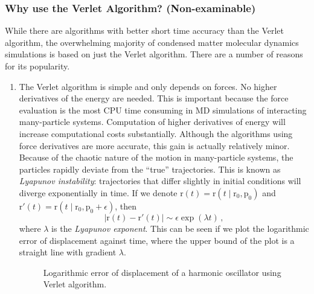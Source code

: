 \documentclass{article}
\theoremstyle{plain}\theoremheaderfont{\normalfont\itshape}\theorembodyfont{\rmfamily}\theoremseparator{.}\newtheorem*{rem}{Remark}\newtheorem*{ex}{Example}\newtheorem*{proof}{Proof}\newtheorem*{altp}{Alternative proof}
\theoremstyle{plain}\theoremheaderfont{\normalfont\bfseries}\theorembodyfont{\rmfamily}\theoremseparator{.}\newtheorem{thm}{Theorem}[section]\newtheorem{lem}[thm]{Lemma}\newtheorem{prop}[thm]{Proposition}\newtheorem*{cor}{Corollary}\newtheorem{defn}[thm]{Definition}\newtheorem{clm}[thm]{Claim}\newtheorem{clminproof}{Claim}\newtheorem{alg}[thm]{Algorithm}\newtheorem{hyp}[thm]{Hypothesis}\newtheorem{law}[thm]{Law}
\theoremstyle{break}\theoremheaderfont{\normalfont\itshape}\theorembodyfont{\rmfamily}\theoremseparator{.\medskip}\newtheorem*{proofskip}{Proof}\newtheorem*{exs}{Examples}\newtheorem*{rems}{Remarks}
\theoremstyle{break}\theoremheaderfont{\normalfont\bfseries}\theorembodyfont{\rmfamily}\theoremseparator{.\medskip}\newtheorem{lemskip}[thm]{Lemma}\newtheorem{defnskip}[thm]{Definition}\newtheorem{propskip}[thm]{Proposition}\newtheorem{thmskip}[thm]{Theorem}
\numberwithin{equation}{section}
\newcommand{\vb}[1]{\bm{\mathrm{#1}}}
\newcommand{\abs}[1]{\left| #1 \right|}
\begin{document}
    \subsubsection{Why use the Verlet Algorithm? (Non-examinable)}
    While there are algorithms with better short time accuracy than the Verlet algorithm, the overwhelming majority of condensed matter molecular dynamics simulations is based on just the Verlet algorithm. There are a number of reasons for its popularity.
    \begin{enumerate}[topsep=0pt,label=(\roman*)]
        \item The Verlet algorithm is simple and only depends on forces. No higher derivatives of the energy are needed. This is important because the force evaluation is the most CPU time consuming in MD simulations of interacting many-particle systems. Computation of higher derivatives of energy will increase computational costs substantially. Although the algorithms using force derivatives are more accurate, this gain is actually relatively minor. Because of the chaotic nature of the motion in many-particle systems, the particles rapidly deviate from the ``true'' trajectories. This is known as \textit{Lyapunov instability}: trajectories that differ slightly in initial conditions will diverge exponentially in time. If we denote \(\vb{r}(t)=\vb{r}(t\mid \vb{r}_0,\vb{p}_0)\) and \(\vb{r}'(t)=\vb{r}(t\mid \vb{r}_0,\vb{p}_0+\epsilon)\), then
        \begin{equation}
            \abs{\vb{r}(t)-\vb{r}'(t)}\sim\epsilon\exp(\lambda t)\,,
        \end{equation}
        where \(\lambda\) is the \textit{Lyapunov exponent}. This can be seen if we plot the logarithmic error of displacement against time, where the upper bound of the plot is a straight line with gradient \(\lambda\).

        \begin{figure}[ht!]
            \centering
            
            \caption{Logarithmic error of displacement of a harmonic oscillator using Verlet algorithm.}
        \end{figure}
        

\end{enumerate}
\end{document}
